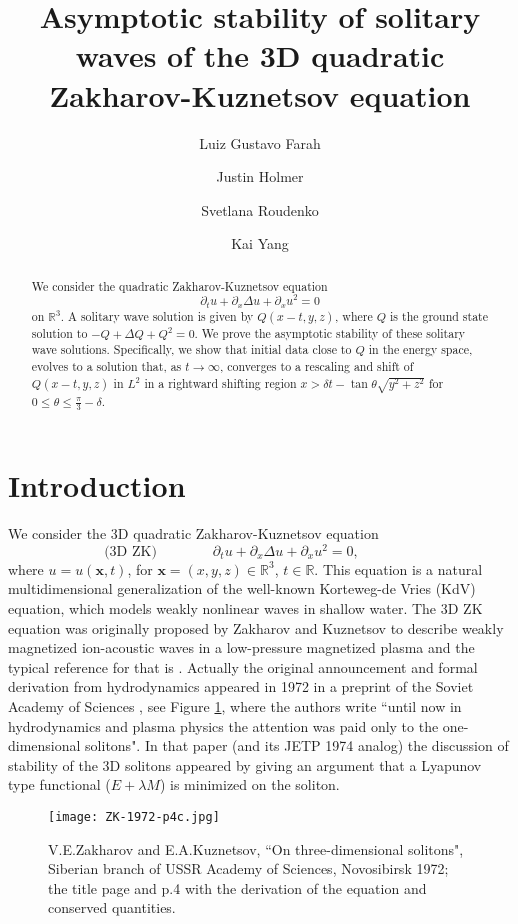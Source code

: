 \documentclass[12pt,letterpaper]{amsart}
\title[3D ZK asymptotic stability]{Asymptotic stability of solitary waves of the 3D quadratic Zakharov-Kuznetsov equation}
\author[L. G. Farah]{Luiz Gustavo Farah}
\author[J. Holmer]{Justin Holmer}
\author[S. Roudenko]{Svetlana Roudenko}
\author[K. Yang]{Kai Yang}
\date{}
\theoremstyle{remark}
\numberwithin{equation}{section}
\numberwithin{theorem}{section}
\numberwithin{table}{section}
\begin{document}
\begin{abstract}
We consider the quadratic Zakharov-Kuznetsov equation
$$
\partial_t u + \partial_x \Delta u + \partial_x u^2 =0
$$
on $\mathbb{R}^3$.  A solitary wave solution is given by $Q(x-t,y,z)$, where $Q$ is the ground state solution to  $-Q + \Delta Q + Q^2 =0$.
We prove the asymptotic stability of these solitary wave solutions.   Specifically, we show that initial data close to $Q$ in the energy space, evolves to a solution that, as $t\to\infty$, converges to a rescaling and shift of $Q(x-t,y,z)$ in $L^2$ in a rightward shifting region $x> \delta t -\tan \theta \sqrt{y^2+z^2} $  for  $0 \leq \theta \leq \frac{\pi}{3}-\delta$.  
\end{abstract}

\maketitle

\section{Introduction}\label{S:introduction}
We consider the 3D quadratic Zakharov-Kuznetsov equation 
$$
\text{(3D ZK)} \qquad  \qquad  \partial_t u + \partial_x \Delta u + \partial_x u^2 =0, \qquad \qquad 
$$
where $u=u(\mathbf{x},t)$, for $\mathbf{x} = (x,y,z) \in \mathbb{R}^3$, $t \in \mathbb{R}$.
This equation is a natural multidimensional generalization of the well-known Korteweg-de Vries (KdV) equation, which models weakly nonlinear waves in shallow water. The 3D ZK equation was originally proposed by Zakharov and Kuznetsov to describe weakly magnetized ion-acoustic waves in a low-pressure magnetized plasma and the typical reference for that is \cite{ZK1974}. Actually the original announcement and formal derivation from hydrodynamics appeared in 1972 in a preprint of the Soviet Academy of Sciences \cite{ZK1972}, see Figure \ref{fig:ZK-1972}, where the authors write ``until now in hydrodynamics and plasma physics the attention was paid only to the one-dimensional solitons".  In that paper (and its JETP 1974 analog) the discussion of stability of the 3D solitons appeared by giving an argument that a Lyapunov type functional ($E+\lambda M$) is minimized on the soliton.  

\begin{figure}[ht]
\texttt{[image: ZK-1972-p4c.jpg]}
\caption{\small{V.E.Zakharov and E.A.Kuznetsov, ``On three-dimensional solitons", Siberian branch of USSR Academy of Sciences, Novosibirsk 1972; the title page and p.4 with the derivation of the equation and conserved quantities.} }
\label{fig:ZK-1972}
\end{figure}
\end{document}

